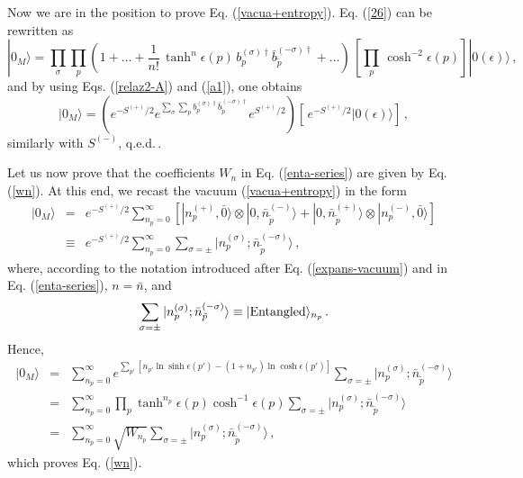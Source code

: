 Now we are in the position to prove Eq. (\ref{vacua+entropy}). Eq.
(\ref{26}) can be rewritten as
\begin{equation}\label{vac1A}
  |0_M\rangle = \prod_\sigma\prod_p \left( 1+\ldots +
  \frac{1}{n!}\,\tanh^n\epsilon(p)\,
  b_p^{(\sigma)\dagger} \bar{b}_{\tilde
 p}^{(-\sigma)\dagger}+\ldots \right)\,
 \left[\prod_p\,\cosh^{-2} \epsilon(p)\right] |0(\epsilon)\rangle\,{,}
\end{equation}
and by using Eqs. (\ref{relaz2-A}) and (\ref{a1}), one obtains
\begin{equation}\label{vacfin}
 |0_M\rangle = \left(e^{-S^{(+)}/2}e^{\sum_\sigma\sum_p b_p^{(\sigma)\dagger} \bar{b}_{\tilde
 p}^{(-\sigma)\dagger}}e^{S^{(+)}/2}\right)\left[\,e^{-S^{(+)}/2}|0(\epsilon)\rangle \right]
 \,,
\end{equation}
similarly with $S^{(-)}$, q.e.d.\,.

 Let us now prove that the coefficients $W_n$ in Eq.
(\ref{enta-series}) are given by Eq. (\ref{wn}). At this end, we
recast the vacuum (\ref{vacua+entropy}) in the form
\begin{eqnarray}\label{vac2A}
  |0_M\rangle &=&e^{-S^{(+)}/2}\sum_{n_p=0}^\infty \left[
  |n_p^{(+)}, {\bar 0}\rangle \otimes |0, {\bar n}_{\tilde
  p}^{(-)}\rangle + |0, {\bar n}_{\tilde
  p}^{(+)}\rangle \otimes |n_p^{(-)}, {\bar 0}\rangle\right] \\
   &\equiv & e^{-S^{(+)}/2} \sum_{n_p=0}^\infty \sum_{\sigma=\pm} |n_p^{(\sigma)};{\bar n}_{\tilde
   p}^{(-\sigma)}\rangle \nonumber \,,
\end{eqnarray}
where, according to the notation introduced after Eq.
(\ref{expans-vacuum}) and in Eq. (\ref{enta-series}), $n={\bar
n}$, and
 \[
 \sum_{\sigma=\pm} |n_p^{(\sigma)}; {\bar n}_{\tilde
   p}^{(-\sigma)}\rangle \equiv |{\rm Entangled}\rangle_{n_p}\,.
 \]
Hence,
\begin{eqnarray}\label{vac3A}
 |0_M\rangle &=& \sum_{n_p=0}^\infty e^{\sum_{p'}[n_{p'}\ln \sinh\epsilon(p')-
 (1+n_{p'})\ln\cosh\epsilon(p')]}
 \sum_{\sigma=\pm} |n_p^{(\sigma)}; {\bar n}_{\tilde
   p}^{(-\sigma)}\rangle  \\
  &=& \sum_{n_p=0}^\infty\prod_p
  \tanh^{n_p}\epsilon(p)\cosh^{-1}\epsilon(p)\sum_{\sigma=\pm} |n_p^{(\sigma)}; {\bar n}_{\tilde
   p}^{(-\sigma)}\rangle \nonumber \\
   &=& \sum_{n_p=0}^\infty \sqrt{W_{n_p}}\sum_{\sigma=\pm} |n_p^{(\sigma)}; {\bar n}_{\tilde
   p}^{(-\sigma)}\rangle\,, \nonumber
\end{eqnarray}
which proves Eq. (\ref{wn}).



